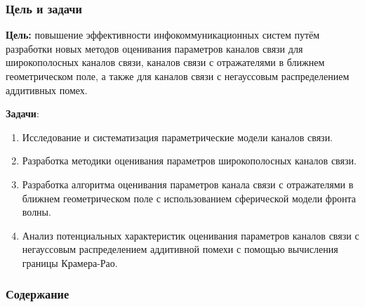 \begin{frame}
    \setcounter{framenumber}{1}
    \maketitle
\end{frame}

\begin{frame}
	\frametitle{Цель и задачи}
	
	\textbf{Цель:} повышение эффективности инфокоммуникационных систем путём разработки новых методов оценивания параметров каналов связи для широкополосных каналов связи, каналов связи с отражателями в ближнем геометрическом поле, а также для каналов связи с негауссовым распределением аддитивных помех.
	
	\textbf{Задачи}:
	\begin{enumerate}
		\item Исследование и систематизация параметрические модели каналов связи.
		\item Разработка методики оценивания параметров широкополосных каналов связи.
		\item Разработка алгоритма оценивания параметров канала связи с отражателями в ближнем геометрическом поле с использованием сферической модели фронта волны.
		\item Анализ потенциальных характеристик оценивания параметров каналов связи с негауссовым распределением аддитивной помехи с помощью вычисления границы Крамера-Рао.
	\end{enumerate}

	\nocite{vakbib1}%
	\nocite{vakbib2}%
	\nocite{Zhang2017}%
	\nocite{Podkurkov2017}%
	\nocite{Podkurkov2019}
	\nocite{Podkurkov2018}%
	\nocite{otherbib1}%
\end{frame}

\begin{frame}
    \frametitle{Содержание}
    \tableofcontents
\end{frame}
